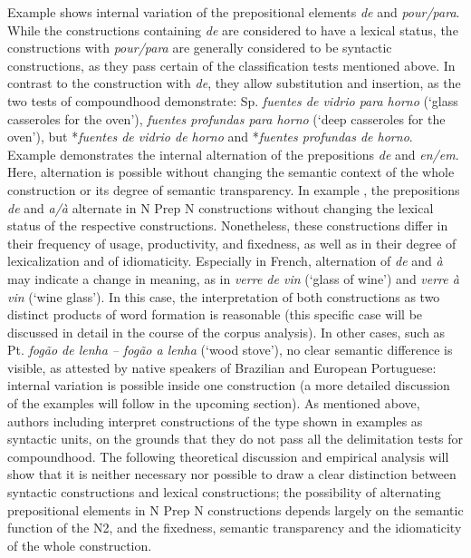 \documentclass[output=paper]{langsci/langscibook}
\begin{document}
Example  shows internal variation of the prepositional elements \textit{de} and \textit{pour/para}. While the constructions containing \textit{de} are considered to have a lexical status, the constructions with \textit{pour/para} are generally considered to be syntactic constructions, as they pass certain of the classification tests mentioned above. In contrast to the construction with \textit{de}, they allow substitution and insertion, as the two tests of compoundhood demonstrate: Sp. \textit{fuentes de vidrio para horno} (`glass casseroles for the oven'), \textit{fuentes profundas para horno} (`deep casseroles for the oven'), but *\textit{fuentes de vidrio de horno} and *\textit{fuentes profundas de horno}. Example  demonstrates the internal alternation of the prepositions \textit{de} and \textit{en/em}. Here, alternation is possible without changing the semantic context of the whole construction or its degree of semantic transparency. In example , the prepositions \textit{de} and \textit{a/à} alternate in N Prep N constructions without changing the lexical status of the respective constructions. Nonetheless, these constructions differ in their frequency of usage, productivity, and fixedness, as well as in their degree of lexicalization and of idiomaticity. Especially in French, alternation of \textit{de} and \textit{à} may indicate a change in meaning, as in \textit{verre de vin} (`glass of wine') and \textit{verre à vin} (`wine glass'). In this case, the interpretation of both constructions as two distinct products of word formation is reasonable (this specific case will be discussed in detail in the course of the corpus analysis). In other cases, such as Pt. \textit{fogão de lenha – fogão a lenha} (`wood stove'), no clear semantic difference is visible, as attested by native speakers of Brazilian and European Portuguese: internal variation is possible inside one construction (a more detailed discussion of the examples will follow in the upcoming section). As mentioned above, authors including \citet{RioTorto:2009} interpret constructions of the type shown in examples  as syntactic units, on the grounds that they do not pass all the delimitation tests for compoundhood. The following theoretical discussion and empirical analysis will show that it is neither necessary nor possible to draw a clear distinction between syntactic constructions and lexical constructions; the possibility of alternating prepositional elements in N Prep N constructions depends largely on the semantic function of the N2, and the fixedness, semantic transparency and the idiomaticity of the whole construction.
  
\end{document}
